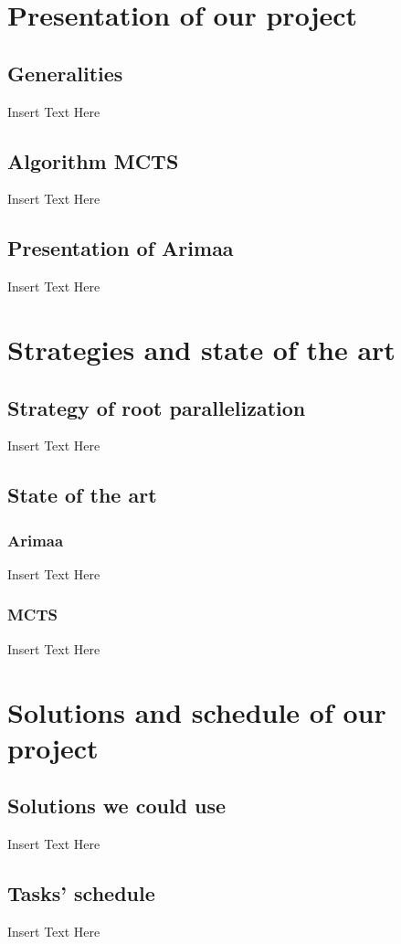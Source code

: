 \documentclass[12pt]{article}
\begin{document}
\section{Presentation of our project}
\subsection{Generalities}
Insert Text Here
\subsection{Algorithm MCTS}
Insert Text Here
\subsection{Presentation of Arimaa}
Insert Text Here

\newpage
\section{Strategies and state of the art}
\subsection{Strategy of root parallelization}
Insert Text Here
\subsection{State of the art}
\subsubsection{Arimaa}
Insert Text Here
\subsubsection{MCTS}
Insert Text Here

\newpage
\section{Solutions and schedule of our project}
\subsection{Solutions we could use}
Insert Text Here
\subsection {Tasks' schedule}
Insert Text Here
\newpage
\end{document}
